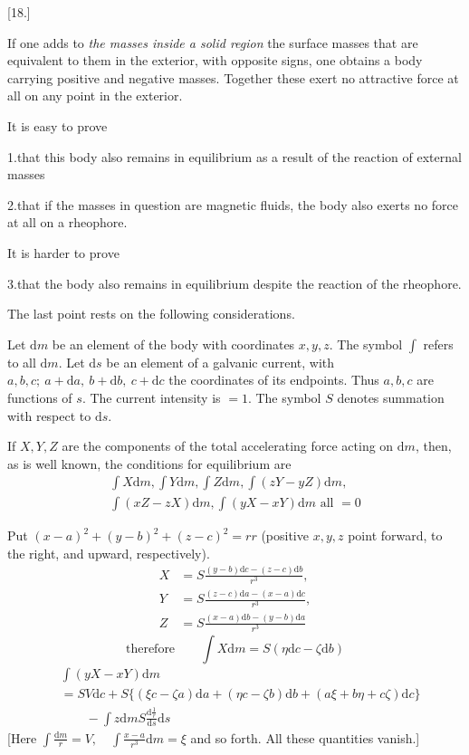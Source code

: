 \begin{center}[18.]\end{center}
If one adds to \textit{the masses inside a solid region} the surface masses that are equivalent to them in the exterior, with opposite signs, one obtains a body carrying positive and negative masses. Together these exert no attractive force at all on any point in the exterior.

It is easy to prove

1.\quad that this body also remains in equilibrium as a result of the reaction of external masses

2.\quad that if the masses in question are magnetic fluids, the body also exerts no force at all on a rheophore.

It is harder to prove

3.\quad that the body also remains in equilibrium despite the reaction of the rheophore.

The last point rests on the following considerations.

Let $\mathrm dm$ be an element of the body with coordinates $x,y,z$. The symbol $\int$ refers to all $\mathrm dm$. Let $\mathrm ds$ be an element of a galvanic current, with $a,b,c;\ a+\mathrm da,\ b+\mathrm db,\ c+\mathrm dc$ the coordinates of its endpoints. Thus $a,b,c$ are functions of $s$. The current intensity is $=1$. The symbol $S$ denotes summation with respect to $\mathrm ds$.

If $X,Y,Z$ are the components of the total accelerating force acting on $\mathrm dm$, then, as is well known, the conditions for equilibrium are
\[
\begin{gathered}
\int X\mathrm dm,\int Y\mathrm dm,\int Z\mathrm dm,\int(zY-yZ)\mathrm dm,\\
\int(xZ-zX)\mathrm dm,\int(yX-xY)\mathrm dm\text{ all }=0
\end{gathered}
\]

Put $(x-a)^2+(y-b)^2+(z-c)^2=rr$ (positive $x,y,z$ point forward, to the right, and upward, respectively).
\[
\begin{aligned}
X&=S\frac{(y-b)\mathrm dc-(z-c)\mathrm db}{r^3},\\
Y&=S\frac{(z-c)\mathrm da-(x-a)\mathrm dc}{r^3},\\
Z&=S\frac{(x-a)\mathrm db-(y-b)\mathrm da}{r^3}
\end{aligned}
\]
\[
\text{therefore}\qquad\int X\mathrm dm=S(\eta\mathrm dc-\zeta\mathrm db)
\]
\[
\begin{aligned}
&\int(yX-xY)\mathrm dm\\
&=SV\mathrm dc+S\{(\xi c-\zeta a)\mathrm da+(\eta c-\zeta b)\mathrm db+(a\xi+b\eta+c\zeta)\mathrm dc\}\\
&\qquad-\int z\mathrm dmS\frac{\mathrm d\frac1r}{\mathrm ds}\mathrm ds
\end{aligned}
\]
[Here $\displaystyle\int\frac{\mathrm dm}{r}=V,\quad\int\frac{x-a}{r^3}\mathrm dm=\xi$ and so forth. All these quantities vanish.]

